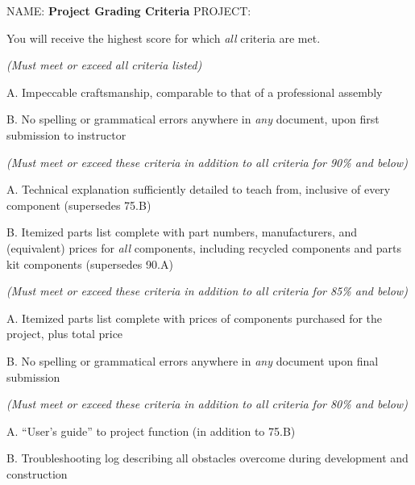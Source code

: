 

\centerline{NAME: \underbar{\hskip 80pt} \hskip 40pt  {\bf Project Grading Criteria}  \hskip 40pt PROJECT: \underbar{\hskip 80pt}}

You will receive the highest score for which {\it all} criteria are met.

\vskip 15pt

\goodbreak
\noindent
{} {\it (Must meet or exceed all criteria listed)}
\item{A.} Impeccable craftsmanship, comparable to that of a professional assembly
\item{B.} No spelling or grammatical errors anywhere in {\it any} document, upon first submission to instructor

\vskip 15pt

\goodbreak
\noindent
{} {\it (Must meet or exceed these criteria in addition to all criteria for 90\% and below)}
\item{A.} Technical explanation sufficiently detailed to teach from, inclusive of every component (supersedes 75.B)
\item{B.} Itemized parts list complete with part numbers, manufacturers, and (equivalent) prices for {\it all} components, including recycled components and parts kit components (supersedes 90.A)

\vskip 15pt

\goodbreak
\noindent
{} {\it (Must meet or exceed these criteria in addition to all criteria for 85\% and below)}
\item{A.} Itemized parts list complete with prices of components purchased for the project, plus total price
\item{B.} No spelling or grammatical errors anywhere in {\it any} document upon final submission

\vskip 15pt

\goodbreak
\noindent
{} {\it (Must meet or exceed these criteria in addition to all criteria for 80\% and below)}
\item{A.} ``User's guide'' to project function (in addition to 75.B)
\item{B.} Troubleshooting log describing all obstacles overcome during development and construction

\vskip 15pt

